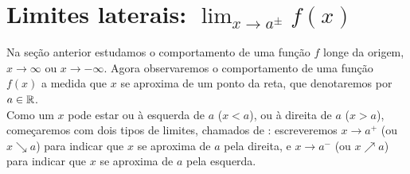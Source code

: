 % 

\section{Limites laterais: $\lim_{x\to a^\pm}f(x)$}\label{Sec:Lim}
Na seção anterior estudamos o comportamento de uma função $f$
longe da origem, $x\to\infty$ ou $x\to-\infty$. 
Agora observaremos
o comportamento de uma função $f(x)$ a medida que $x$ 
se aproxima de um ponto da reta, que denotaremos por $a\in \mathbb{R}$.
\\

Como um $x$ pode estar ou à esquerda de $a$ ($x<a$), ou à direita
de $a$ ($x>a$), começaremos com dois tipos de limites, chamados de
: escreveremos $x\to a^+$ (ou $x\searrow a$) para
indicar que $x$ se aproxima de $a$ pela direita, e 
$x\to a^-$ (ou $x\nearrow a$) para indicar que $x$ se aproxima de $a$ pela esquerda.

